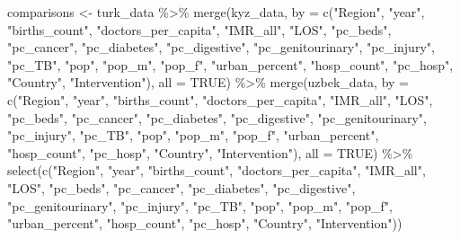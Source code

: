 \documentclass[
]{article}
\newenvironment{Shaded}{\begin{snugshade}}{\end{snugshade}}
\newcommand{\AttributeTok}[1]{\textcolor[rgb]{0.77,0.63,0.00}{#1}}
\newcommand{\ConstantTok}[1]{\textcolor[rgb]{0.00,0.00,0.00}{#1}}
\newcommand{\FunctionTok}[1]{\textcolor[rgb]{0.00,0.00,0.00}{#1}}
\newcommand{\NormalTok}[1]{#1}
\newcommand{\OtherTok}[1]{\textcolor[rgb]{0.56,0.35,0.01}{#1}}
\newcommand{\SpecialCharTok}[1]{\textcolor[rgb]{0.00,0.00,0.00}{#1}}
\newcommand{\StringTok}[1]{\textcolor[rgb]{0.31,0.60,0.02}{#1}}
\begin{document}
\begin{Shaded}
\begin{Highlighting}[]
\NormalTok{comparisons }\OtherTok{\textless{}{-}}\NormalTok{ turk\_data }\SpecialCharTok{\%\textgreater{}\%}
  \FunctionTok{merge}\NormalTok{(kyz\_data, }\AttributeTok{by =} \FunctionTok{c}\NormalTok{(}\StringTok{"Region"}\NormalTok{, }\StringTok{"year"}\NormalTok{, }\StringTok{"births\_count"}\NormalTok{, }\StringTok{"doctors\_per\_capita"}\NormalTok{, }\StringTok{"IMR\_all"}\NormalTok{, }\StringTok{"LOS"}\NormalTok{, }\StringTok{"pc\_beds"}\NormalTok{, }\StringTok{"pc\_cancer"}\NormalTok{, }\StringTok{"pc\_diabetes"}\NormalTok{, }\StringTok{"pc\_digestive"}\NormalTok{, }\StringTok{"pc\_genitourinary"}\NormalTok{, }\StringTok{"pc\_injury"}\NormalTok{, }\StringTok{"pc\_TB"}\NormalTok{, }\StringTok{"pop"}\NormalTok{, }\StringTok{"pop\_m"}\NormalTok{, }\StringTok{"pop\_f"}\NormalTok{, }\StringTok{"urban\_percent"}\NormalTok{, }\StringTok{"hosp\_count"}\NormalTok{, }\StringTok{"pc\_hosp"}\NormalTok{, }\StringTok{"Country"}\NormalTok{, }\StringTok{"Intervention"}\NormalTok{), }\AttributeTok{all =} \ConstantTok{TRUE}\NormalTok{) }\SpecialCharTok{\%\textgreater{}\%}
  \FunctionTok{merge}\NormalTok{(uzbek\_data, }\AttributeTok{by =} \FunctionTok{c}\NormalTok{(}\StringTok{"Region"}\NormalTok{, }\StringTok{"year"}\NormalTok{, }\StringTok{"births\_count"}\NormalTok{, }\StringTok{"doctors\_per\_capita"}\NormalTok{, }\StringTok{"IMR\_all"}\NormalTok{, }\StringTok{"LOS"}\NormalTok{, }\StringTok{"pc\_beds"}\NormalTok{, }\StringTok{"pc\_cancer"}\NormalTok{, }\StringTok{"pc\_diabetes"}\NormalTok{, }\StringTok{"pc\_digestive"}\NormalTok{, }\StringTok{"pc\_genitourinary"}\NormalTok{, }\StringTok{"pc\_injury"}\NormalTok{, }\StringTok{"pc\_TB"}\NormalTok{, }\StringTok{"pop"}\NormalTok{, }\StringTok{"pop\_m"}\NormalTok{, }\StringTok{"pop\_f"}\NormalTok{, }\StringTok{"urban\_percent"}\NormalTok{, }\StringTok{"hosp\_count"}\NormalTok{, }\StringTok{"pc\_hosp"}\NormalTok{, }\StringTok{"Country"}\NormalTok{, }\StringTok{"Intervention"}\NormalTok{), }\AttributeTok{all =} \ConstantTok{TRUE}\NormalTok{) }\SpecialCharTok{\%\textgreater{}\%}
  \FunctionTok{select}\NormalTok{(}\FunctionTok{c}\NormalTok{(}\StringTok{"Region"}\NormalTok{, }\StringTok{"year"}\NormalTok{, }\StringTok{"births\_count"}\NormalTok{, }\StringTok{"doctors\_per\_capita"}\NormalTok{, }\StringTok{"IMR\_all"}\NormalTok{, }\StringTok{"LOS"}\NormalTok{, }\StringTok{"pc\_beds"}\NormalTok{, }\StringTok{"pc\_cancer"}\NormalTok{, }\StringTok{"pc\_diabetes"}\NormalTok{, }\StringTok{"pc\_digestive"}\NormalTok{, }\StringTok{"pc\_genitourinary"}\NormalTok{, }\StringTok{"pc\_injury"}\NormalTok{, }\StringTok{"pc\_TB"}\NormalTok{, }\StringTok{"pop"}\NormalTok{, }\StringTok{"pop\_m"}\NormalTok{, }\StringTok{"pop\_f"}\NormalTok{, }\StringTok{"urban\_percent"}\NormalTok{, }\StringTok{"hosp\_count"}\NormalTok{, }\StringTok{"pc\_hosp"}\NormalTok{, }\StringTok{"Country"}\NormalTok{, }\StringTok{"Intervention"}\NormalTok{))}
\end{Highlighting}
\end{Shaded}
\end{document}
